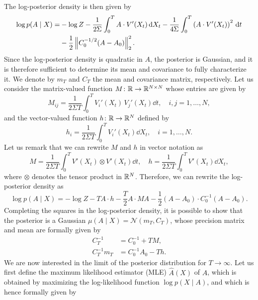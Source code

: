 \documentclass[10pt]{article}
\begin{document}
The log-posterior density is then given by
\begin{equation}
\begin{aligned}
	\log p(A \mid X) = &-\log Z -\frac1{2\Sigma}\int_0^T A \cdot V'(X_t) \,\mathrm{d} X_t - \frac1{4\Sigma} \int_0^T \left(A \cdot V'(X_t) \right)^2 \,\mathrm{d} t \\
	&- \frac12 \left\|C_0^{-1/2}(A - A_0)\right\|_2^2.
\end{aligned}
\end{equation}
Since the log-posterior density is quadratic in $A$, the posterior is Gaussian, and it is therefore sufficient to determine its mean and covariance to fully characterize it. We denote by $m_T$ and $C_T$ the mean and covariance matrix, respectively. Let us consider the matrix-valued function $M \colon \mathbb{R} \to \mathbb{R}^{N\times N}$ whose entries are given by
\begin{equation}
	M_{ij} = \frac1{2\Sigma T} \int_0^T V_i'(X_t) \, V_j'(X_t) \dd t, \quad i, j = 1, \ldots, N,
\end{equation}
and the vector-valued function $h \colon \mathbb{R} \to \mathbb{R}^N$ defined by
\begin{equation}
	h_i = \frac1{2\Sigma T} \int_0^T V_i'(X_t) \dd X_t, \quad i = 1, \ldots, N.
\end{equation}
Let us remark that we can rewrite $M$ and $h$ in vector notation as
\begin{equation}
		M = \frac1{2\Sigma T} \int_0^T V'(X_t) \otimes V'(X_t) \dd t, \quad h = \frac1{2\Sigma T} \int_0^T V'(X_t) \dd X_t,
\end{equation}
where $\otimes$ denotes the tensor product in $\mathbb{R}^N$. Therefore, we can rewrite the log-posterior density as
\begin{equation}
	\log p(A \mid X) = -\log Z - T A \cdot h - \frac{T}{2} A \cdot M A - \frac12 (A - A_0) \cdot C_0^{-1}(A-A_0).
\end{equation}
Completing the squares in the log-posterior density, it is possible to show that the posterior is a Gaussian $\mu(A \mid X) = \mathcal N(m_T, C_T)$, whose precision matrix and mean are formally given by
\begin{equation}
\begin{aligned}
	C_T^{-1} &= C_0^{-1} + T M, \\
	C_T^{-1}m_T &= C_0^{-1}A_0 - T h. 
\end{aligned}
\end{equation}
We are now interested in the limit of the posterior distribution for $T \to \infty$. Let us first define the maximum likelihood estimator (MLE) $\widehat A(X)$ of $A$, which is obtained by maximizing the log-likelihood function $\log p(X \mid A)$, and which is hence formally given by
\end{document}
